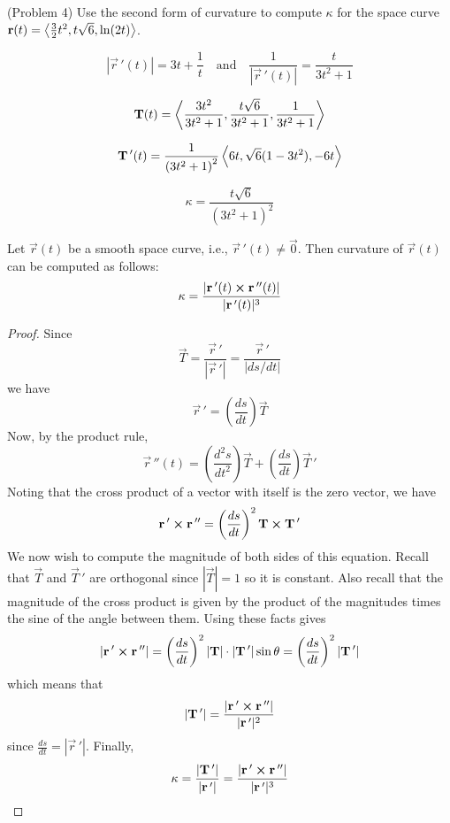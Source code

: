 \documentclass[handout]{ximera}
\begin{document}
\begin{problem}(Problem 4)
Use the second form of curvature to compute $\kappa$ for the space curve $\mathbf r(t) = \left\langle \frac32 t^2, t\sqrt 6 , \ln(2t)\right\rangle$.


\begin{hint}
\[
\left|\vec r\,'(t) \right| = 3t + \frac{1}{t}  \quad \text{and} \quad \frac{1}{\left|\vec r\,'(t) \right|} = \frac{t}{3t^2 + 1}
\]
\end{hint}

\begin{hint}
\[
\mathbf T(t) = \left\langle \frac{3t^2}{3t^2 +1},\frac{t\sqrt 6}{3t^2 +1} , \frac{1}{3t^2 +1}\right\rangle
\]
\end{hint}

\begin{hint}
\[
\mathbf T\,'(t) = \frac{1}{\left(3t^2 +1\right)^2} \left\langle 6t, \sqrt 6 (1 - 3t^2), -6t\right\rangle
\]
\end{hint}

\begin{hint}
\[
\kappa = \frac{t\sqrt 6}{\left(3t^2 +1\right)^2}
\]
\end{hint}

\end{problem}


\begin{proposition}
Let $\vec r(t)$ be a smooth space curve, i.e., $\vec r\,'(t) \neq \vec 0$. Then curvature of $\vec r(t)$ can be computed as follows:
\[
\kappa = \frac{|\mathbf r\,'(t) \boldsymbol\times \mathbf r\,''(t)|}{|\mathbf r\,'(t)|^3}
\]
\end{proposition}


\begin{proof}
Since
\[
\vec T = \frac{\vec r\,'}{|\vec r\, '|} = \frac{\vec r\,'}{|ds/dt|}
\]
we have
\[
\vec r\,' = \left(\frac{ds}{dt}\right) \vec T
\]
Now, by the product rule,
\[
 \vec r\,''(t) = \left(\frac{d^2s}{dt^2}\right) \vec T + \left(\frac{ds}{dt}\right) \vec T\,'
\]
Noting that the cross product of a vector with itself is the zero vector, we have
\[
\mathbf r\,' \boldsymbol\times \mathbf r\,'' = \left(\frac{ds}{dt}\right)^2 \mathbf T \boldsymbol\times \mathbf T\,'
\]
We now wish to compute the magnitude of both sides of this equation.
Recall that $\vec T$ and $\vec T\,'$ are orthogonal since $|\vec T| = 1$ so it is constant. Also recall that the 
magnitude of the cross product is given by the product of the magnitudes times the sine of the angle between them. 
Using these facts gives
\[
|\mathbf r\,' \boldsymbol\times \mathbf r\,''| = \left(\frac{ds}{dt}\right)^2 | \mathbf T|\cdot | \mathbf T\,'|\sin \theta =\left(\frac{ds}{dt}\right)^2 | \mathbf T\,'|
\]
which means that
\[
| \mathbf T\,'| = \frac{|\mathbf r\,' \boldsymbol\times \mathbf r\,''|}{|\mathbf r\,'|^2}
\]
since $\frac{ds}{dt} = |\vec r\,'|$.
Finally,
\[
\kappa = \frac{| \mathbf T\,'|}{|\mathbf r\,'|} = \frac{|\mathbf r\,' \boldsymbol\times \mathbf r\,''|}{|\mathbf r\,'|^3}
\]
\end{proof}
\end{document}
